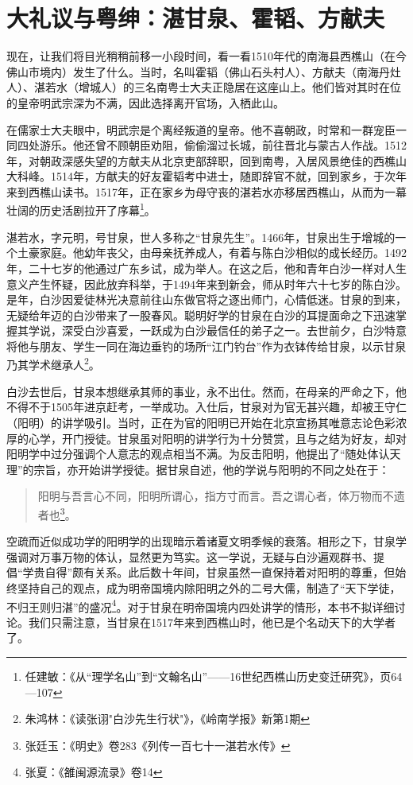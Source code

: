 \section{大礼议与粤绅：湛甘泉、霍韬、方献夫}

现在，让我们将目光稍稍前移一小段时间，看一看1510年代的南海县西樵山（在今佛山市境内）发生了什么。当时，名叫霍韬（佛山石头村人）、方献夫（南海丹灶人）、湛若水（增城人）的三名南粤士大夫正隐居在这座山上。他们皆对其时在位的皇帝明武宗深为不满，因此选择离开官场，入栖此山。

在儒家士大夫眼中，明武宗是个离经叛道的皇帝。他不喜朝政，时常和一群宠臣一同四处游乐。他还曾不顾朝臣劝阻，偷偷溜过长城，前往晋北与蒙古人作战。1512年，对朝政深感失望的方献夫从北京吏部辞职，回到南粤，入居风景绝佳的西樵山大科峰。1514年，方献夫的好友霍韬考中进士，随即辞官不就，回到家乡，于次年来到西樵山读书。1517年，正在家乡为母守丧的湛若水亦移居西樵山，从而为一幕壮阔的历史活剧拉开了序幕\footnote{任建敏：《从“理学名山”到“文翰名山”——16世纪西樵山历史变迁研究》，页64—107}。

湛若水，字元明，号甘泉，世人多称之“甘泉先生”。1466年，甘泉出生于增城的一个土豪家庭。他幼年丧父，由母亲抚养成人，有着与陈白沙相似的成长经历。1492年，二十七岁的他通过广东乡试，成为举人。在这之后，他和青年白沙一样对人生意义产生怀疑，因此放弃科举，于1494年来到新会，师从时年六十七岁的陈白沙。是年，白沙因爱徒林光决意前往山东做官将之逐出师门，心情低迷。甘泉的到来，无疑给年迈的白沙带来了一股春风。聪明好学的甘泉在白沙的耳提面命之下迅速掌握其学说，深受白沙喜爱，一跃成为白沙最信任的弟子之一。去世前夕，白沙特意将他与朋友、学生一同在海边垂钓的场所“江门钓台”作为衣钵传给甘泉，以示甘泉乃其学术继承人\footnote{朱鸿林：《读张诩"白沙先生行状"》，《岭南学报》新第1期}。

白沙去世后，甘泉本想继承其师的事业，永不出仕。然而，在母亲的严命之下，他不得不于1505年进京赶考，一举成功。入仕后，甘泉对为官无甚兴趣，却被王守仁（阳明）的讲学吸引。当时，正在为官的阳明已开始在北京宣扬其唯意志论色彩浓厚的心学，开门授徒。甘泉虽对阳明的讲学行为十分赞赏，且与之结为好友，却对阳明学中过分强调个人意志的观点相当不满。为反击阳明，他提出了“随处体认天理”的宗旨，亦开始讲学授徒。据甘泉自述，他的学说与阳明的不同之处在于：

\begin{quote}

阳明与吾言心不同，阳明所谓心，指方寸而言。吾之谓心者，体万物而不遗者也\footnote{张廷玉：《明史》卷283《列传一百七十一湛若水传》}。

\end{quote}

空疏而近似成功学的阳明学的出现暗示着诸夏文明季候的衰落。相形之下，甘泉学强调对万事万物的体认，显然更为笃实。这一学说，无疑与白沙遍观群书、提倡“学贵自得”颇有关系。此后数十年间，甘泉虽然一直保持着对阳明的尊重，但始终坚持自己的观点，成为明帝国境内除阳明之外的二号大儒，制造了“天下学徒，不归王则归湛”的盛况\footnote{张夏：《雒闽源流录》卷14}。对于甘泉在明帝国境内四处讲学的情形，本书不拟详细讨论。我们只需注意，当甘泉在1517年来到西樵山时，他已是个名动天下的大学者了。

